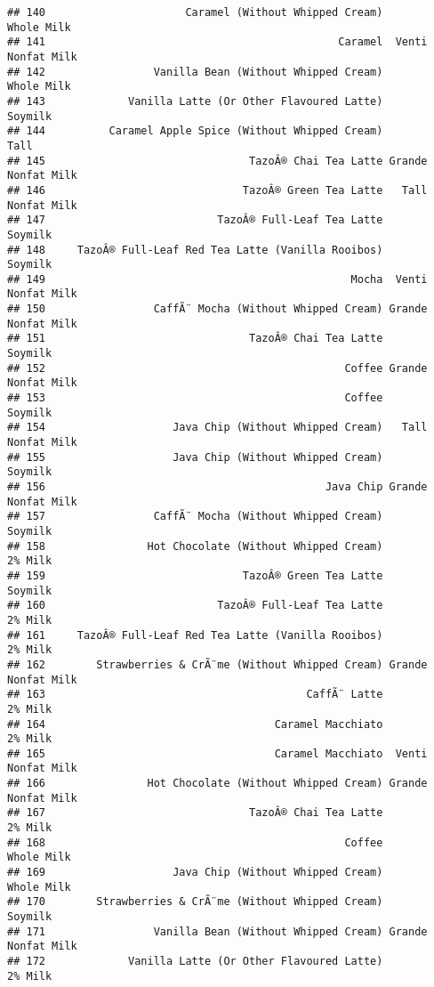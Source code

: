 \documentclass[
]{article}
\begin{document}
\begin{verbatim}
## 140                      Caramel (Without Whipped Cream)         Whole Milk
## 141                                              Caramel  Venti Nonfat Milk
## 142                 Vanilla Bean (Without Whipped Cream)         Whole Milk
## 143             Vanilla Latte (Or Other Flavoured Latte)            Soymilk
## 144          Caramel Apple Spice (Without Whipped Cream)               Tall
## 145                                TazoÂ® Chai Tea Latte Grande Nonfat Milk
## 146                               TazoÂ® Green Tea Latte   Tall Nonfat Milk
## 147                           TazoÂ® Full-Leaf Tea Latte            Soymilk
## 148     TazoÂ® Full-Leaf Red Tea Latte (Vanilla Rooibos)            Soymilk
## 149                                                Mocha  Venti Nonfat Milk
## 150                 CaffÃ¨ Mocha (Without Whipped Cream) Grande Nonfat Milk
## 151                                TazoÂ® Chai Tea Latte            Soymilk
## 152                                               Coffee Grande Nonfat Milk
## 153                                               Coffee            Soymilk
## 154                    Java Chip (Without Whipped Cream)   Tall Nonfat Milk
## 155                    Java Chip (Without Whipped Cream)            Soymilk
## 156                                            Java Chip Grande Nonfat Milk
## 157                 CaffÃ¨ Mocha (Without Whipped Cream)            Soymilk
## 158                Hot Chocolate (Without Whipped Cream)            2% Milk
## 159                               TazoÂ® Green Tea Latte            Soymilk
## 160                           TazoÂ® Full-Leaf Tea Latte            2% Milk
## 161     TazoÂ® Full-Leaf Red Tea Latte (Vanilla Rooibos)            2% Milk
## 162        Strawberries & CrÃ¨me (Without Whipped Cream) Grande Nonfat Milk
## 163                                         CaffÃ¨ Latte            2% Milk
## 164                                    Caramel Macchiato            2% Milk
## 165                                    Caramel Macchiato  Venti Nonfat Milk
## 166                Hot Chocolate (Without Whipped Cream) Grande Nonfat Milk
## 167                                TazoÂ® Chai Tea Latte            2% Milk
## 168                                               Coffee         Whole Milk
## 169                    Java Chip (Without Whipped Cream)         Whole Milk
## 170        Strawberries & CrÃ¨me (Without Whipped Cream)            Soymilk
## 171                 Vanilla Bean (Without Whipped Cream) Grande Nonfat Milk
## 172             Vanilla Latte (Or Other Flavoured Latte)            2% Milk

\end{verbatim}
\end{document}
